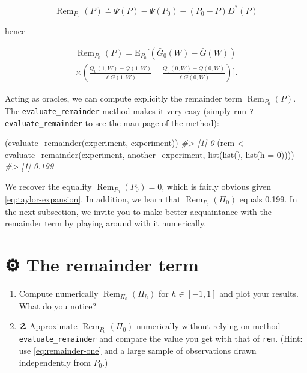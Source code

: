 \documentclass[
  11pt,
  openright,twoside]{book}
\newenvironment{Shaded}{\begin{snugshade}}{\end{snugshade}}
\newcommand{\AttributeTok}[1]{\textcolor[rgb]{0.77,0.63,0.00}{#1}}
\newcommand{\CommentTok}[1]{\textcolor[rgb]{0.56,0.35,0.01}{\textit{#1}}}
\newcommand{\DecValTok}[1]{\textcolor[rgb]{0.00,0.00,0.81}{#1}}
\newcommand{\FunctionTok}[1]{\textcolor[rgb]{0.00,0.00,0.00}{#1}}
\newcommand{\NormalTok}[1]{#1}
\newcommand{\OtherTok}[1]{\textcolor[rgb]{0.56,0.35,0.01}{#1}}
\DeclareMathOperator{\Rem}{Rem}
\newcommand{\gear}{\usebox{\gearbox}\;}
\DeclareRobustCommand{\stixdanger}{%
  {\usefont{U}{stixbbit}{m}{it}\symbol{"F6}}%
}
\newcommand{\defq}{\doteq}
\newcommand{\Exp}{\textrm{E}}
\newcommand{\Gbar}{\bar{G}}
\newcommand{\Qbar}{\bar{Q}}
\theoremstyle{definition}
\theoremstyle{definition}
\theoremstyle{definition}
\theoremstyle{definition}
\theoremstyle{remark}
\begin{document}
\begin{equation}
\Rem_{P_0}(P)    \defq   \Psi(P)    -   \Psi(P_0)    -   (P_0    -   P)D^*(P)
\label{eq:remainder-one}
\end{equation}

hence

\begin{multline} 
\Rem_{P_0}(P)=   \Exp_{P_0}   \Bigg[   \left(\Gbar_0(W)   -
\Gbar(W)\right) \\          \times          \left(\frac{\Qbar_0(1,W)           -
\Qbar(1,W)}{\ell\Gbar(1,W)} + \frac{\Qbar_0(0,W) - \Qbar(0,W)}{\ell\Gbar(0,W)}
\right) \Bigg]. \label{eq:remainder} 
\end{multline}

Acting as oracles, we can compute explicitly the remainder term
\(\Rem_{P_0}(P)\). The \texttt{evaluate\_remainder} method makes it very easy (simply
run \texttt{?evaluate\_remainder} to see the man page of the method):

\begin{Shaded}
\begin{Highlighting}[]
\NormalTok{(}\FunctionTok{evaluate\_remainder}\NormalTok{(experiment, experiment))}
\CommentTok{\#\textgreater{} [1] 0}
\NormalTok{(rem }\OtherTok{\textless{}{-}} \FunctionTok{evaluate\_remainder}\NormalTok{(experiment, another\_experiment,}
                           \FunctionTok{list}\NormalTok{(}\FunctionTok{list}\NormalTok{(), }\FunctionTok{list}\NormalTok{(}\AttributeTok{h =} \DecValTok{0}\NormalTok{))))}
\CommentTok{\#\textgreater{} [1] 0.199}
\end{Highlighting}
\end{Shaded}

We recover the equality \(\Rem_{P_{0}} (P_{0}) = 0\), which is fairly obvious
given \eqref{eq:taylor-expansion}. In addition, we learn that \(\Rem_{P_{0}} (\Pi_{0})\) equals 0.199. In the next subsection, we invite you to
make better acquaintance with the remainder term by playing around with it
numerically.

\hypertarget{exo-remainder-term}{%
\section{\texorpdfstring{⚙ \gear The remainder term}{⚙ The remainder term}}\label{exo-remainder-term}}

\begin{enumerate}
\def\labelenumi{\arabic{enumi}.}
\item
  Compute numerically \(\Rem_{\Pi_0}(\Pi_h)\) for \(h \in [-1,1]\) and plot your
  results. What do you notice?
\item
  ☡ \stixdanger{} Approximate \(\Rem_{P_{0}} (\Pi_{0})\) numerically
  without relying on method \texttt{evaluate\_remainder} and compare the value you get
  with that of \texttt{rem}. (Hint: use \eqref{eq:remainder-one} and a large sample of
  observations drawn independently from \(P_{0}\).)
\end{enumerate}
\end{document}
